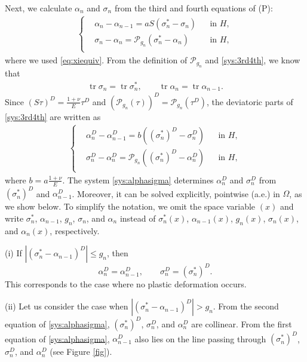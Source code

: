 \documentclass[11pt, a4paper]{article}
\newcommand{\tr}{\operatorname{tr}}
\newcommand{\Hs}{{H}}
\newcommand{\Pop}[1]{\mathcal{P}_{#1}}
\newcommand{\sigmas}[1]{{\sigma_{#1}^*}}
\begin{document}
Next, we calculate $\alpha_n$ and $\sigma_n$ from the third and fourth equations of (P):
\begin{align}\label{sys:3rd4th}\left\{\begin{aligned}
    & \alpha_n - \alpha_{n-1}
    = aS(\sigmas{n} - \sigma_n) &&\mbox{in }\Hs,\\
    &\sigma_n - \alpha_n
    = \Pop{g_n}\left(\sigmas{n} - \alpha_n \right)
    &&\mbox{in }\Hs,\\
\end{aligned}\right.\end{align}
where we used \eqref{eq:xiequiv}.
From the definition of $\Pop{g_n}$ and \eqref{sys:3rd4th}, we know that 
\begin{align}\label{sys:tr}
    \tr\sigma_n=\tr\sigmas{n},\qquad
    \tr\alpha_n=\tr\alpha_{n-1}.
\end{align}
Since $(S\tau)^D=\frac{1+\nu}{E}\tau^D$ and $(\Pop{g_n}(\tau))^D = \Pop{g_n}(\tau^D)$, the deviatoric parts of \eqref{sys:3rd4th} are written as
\begin{align}\label{sys:alphasigma}\left\{\begin{aligned}
    & \alpha^D_n - \alpha^D_{n-1}
    = b((\sigmas{n})^D - \sigma^D_n) &&\mbox{in }\Hs,\\
    &\sigma^D_n - \alpha^D_n
    = \Pop{g_n}\left((\sigmas{n})^D - \alpha^D_n \right)
    &&\mbox{in }\Hs,\\
\end{aligned}\right.\end{align}
where $b = a\frac{1+\nu}{E}$.
The system \eqref{sys:alphasigma} determines $\alpha_n^D$ and $\sigma_n^D$ from $(\sigmas{n})^D$ and $\alpha_{n-1}^D$.
Moreover, it can be solved explicitly, pointwise (a.e.) in $\Omega$, as we show below.
To simplify the notation, we omit the space variable $(x)$ and write
$\sigmas{n}$, $\alpha_{n-1}$, $g_n$, $\sigma_n$, and $\alpha_n$
instead of $\sigmas{n}(x)$, $\alpha_{n-1}(x)$, $g_n(x)$, $\sigma_n(x)$, and $\alpha_n(x)$, respectively.

\smallskip\noindent
(i) If $|(\sigmas{n}-\alpha_{n-1})^D| \le g_n$, then
\[
    \alpha^D_n = \alpha^D_{n-1},\qquad
    \sigma^D_n = (\sigmas{n})^D.
\]
This corresponds to the case where no plastic deformation occurs.

\smallskip\noindent
(ii) Let us consider the case when $|(\sigmas{n}-\alpha_{n-1})^D| > g_n$. From the second equation of \eqref{sys:alphasigma}, $(\sigmas{n})^D$, $\sigma^D_n$, and $\alpha^D_n$ are collinear. From the first equation of \eqref{sys:alphasigma}, $\alpha^D_{n-1}$ also lies on the line passing through $(\sigmas{n})^D$, $\sigma^D_n$, and $\alpha^D_n$ (see Figure \ref{fig}).
\end{document}
